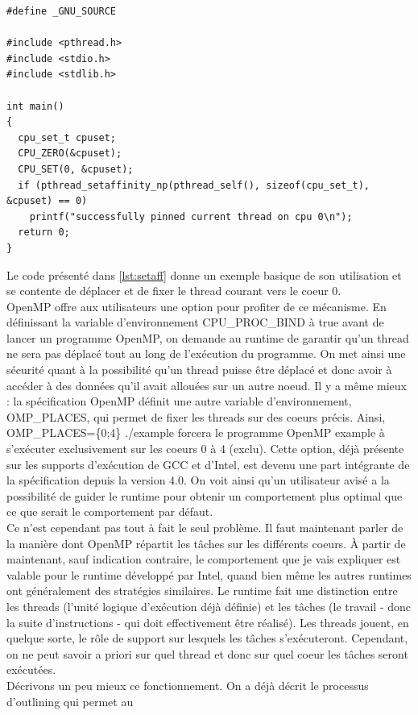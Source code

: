 \documentclass{report}
\begin{document}
\begin{lstlisting}[label={lst:setaff}]
#define _GNU_SOURCE

#include <pthread.h>
#include <stdio.h>
#include <stdlib.h>

int main()
{
  cpu_set_t cpuset;
  CPU_ZERO(&cpuset);
  CPU_SET(0, &cpuset);
  if (pthread_setaffinity_np(pthread_self(), sizeof(cpu_set_t), &cpuset) == 0)
    printf("successfully pinned current thread on cpu 0\n");
  return 0;
}
\end{lstlisting}
Le code présenté dans \ref{lst:setaff} donne un exemple basique de son utilisation et se contente de
déplacer et de fixer le thread courant vers le coeur 0.
\\OpenMP offre aux utilisateurs une option pour profiter de ce mécanisme. En définissant la variable
d'environnement CPU\_PROC\_BIND à true avant de lancer un programme OpenMP, on demande au runtime de 
garantir qu'un thread ne sera pas déplacé tout au long de l'exécution du programme. On met ainsi une
sécurité quant à la possibilité qu'un thread puisse être déplacé et donc avoir à accéder à des données
qu'il avait allouées sur un autre noeud. Il y a même mieux : la spécification OpenMP définit une autre
variable d'environnement, OMP\_PLACES, qui permet de fixer les threads sur des coeurs précis. Ainsi,
OMP\_PLACES=\{0;4\} ./example forcera le programme OpenMP example à s'exécuter exclusivement sur les
coeurs 0 à 4 (exclu). Cette option, déjà présente sur les supports d'exécution de GCC et d'Intel,
est devenu une part intégrante de la spécification depuis la version 4.0.  On voit ainsi qu'un utilisateur
avisé a la possibilité de guider le runtime pour obtenir un comportement plus optimal que ce que serait
le comportement par défaut. 
\\Ce n'est cependant pas tout à fait le seul problème. Il faut maintenant parler de la manière dont
OpenMP répartit les tâches sur les différents coeurs. À partir de maintenant, sauf indication 
contraire, le comportement que je vais expliquer est valable pour le runtime développé par Intel, quand
bien même les autres runtimes ont généralement des stratégies similaires. Le runtime fait une distinction
entre les threads (l'unité logique d'exécution déjà définie) et les tâches (le travail - donc la suite
d'instructions - qui doit effectivement être réalisé). Les threads jouent, en quelque sorte, le rôle
de support sur lesquels les tâches s'exécuteront. Cependant, on ne peut savoir a priori sur quel thread
et donc sur quel coeur les tâches seront exécutées.
\\Décrivons un peu mieux ce fonctionnement. On a déjà décrit le processus d'outlining qui permet au
\end{document}
